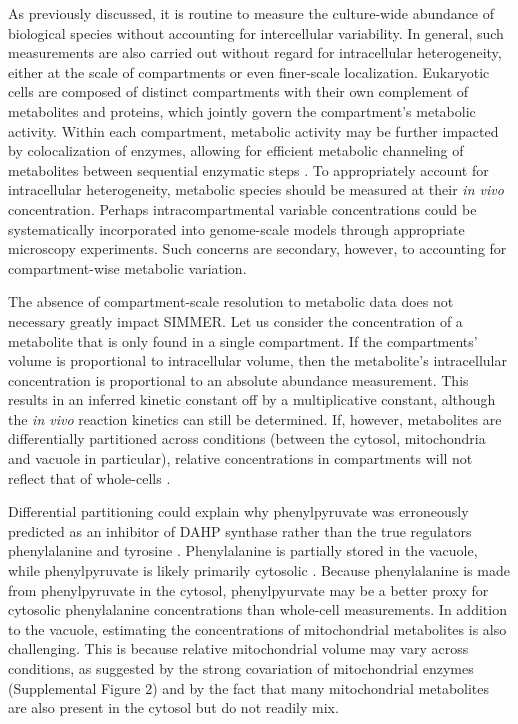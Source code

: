 As previously discussed, it is routine to measure the culture-wide abundance of biological species without accounting for intercellular variability. In general, such measurements are also carried out without regard for intracellular heterogeneity, either at the scale of compartments or even finer-scale localization. Eukaryotic cells are composed of distinct compartments with their own complement of metabolites and proteins, which jointly govern the compartment's metabolic activity. Within each compartment, metabolic activity may be further impacted by colocalization of enzymes, allowing for efficient metabolic channeling of metabolites between sequential enzymatic steps \cite{Ovadi:1995wy}. To appropriately account for intracellular heterogeneity, metabolic species should be measured at their \textit{in vivo} concentration. Perhaps intracompartmental variable concentrations could be systematically incorporated into genome-scale models through appropriate microscopy experiments. Such concerns are secondary, however, to accounting for compartment-wise metabolic variation.

The absence of compartment-scale resolution to metabolic data does not necessary greatly impact SIMMER. Let us consider the concentration of a metabolite that is only found in a single compartment. If the compartments' volume is proportional to intracellular volume, then the metabolite's intracellular concentration is proportional to an absolute abundance measurement. This results in an inferred kinetic constant off by a multiplicative constant, although the \textit{in vivo} reaction kinetics can still be determined. If, however, metabolites are differentially partitioned across conditions (between the cytosol, mitochondria and vacuole in particular), relative concentrations in compartments will not reflect that of whole-cells \cite{Kitamoto:1988wc}.

Differential partitioning could explain why phenylpyruvate was erroneously predicted as an inhibitor of DAHP synthase rather than the true regulators phenylalanine and tyrosine \cite{Schnappauf:1998ec}. Phenylalanine is partially stored in the vacuole, while phenylpyruvate is likely primarily cytosolic \cite{Kitamoto:1988wc}. Because phenylalanine is made from phenylpyruvate in the cytosol, phenylpyurvate may be a better proxy for cytosolic phenylalanine concentrations than whole-cell measurements. In addition to the vacuole, estimating the concentrations of mitochondrial metabolites is also challenging. This is because relative mitochondrial volume may vary across conditions, as suggested by the strong covariation of mitochondrial enzymes (Supplemental Figure 2) and by the fact that many mitochondrial metabolites are also present in the cytosol but do not readily mix.  

